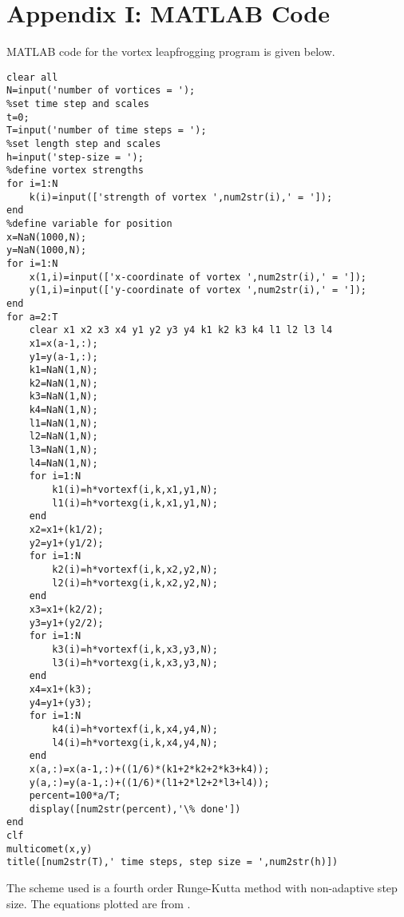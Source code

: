 \documentclass[10pt, a4paper]{article}
\numberwithin{equation}{section}
\begin{document}
\section*{Appendix I: MATLAB Code}\label{sec:ap1}
MATLAB code for the vortex leapfrogging program is given below.
\begin{verbatim}
clear all
N=input('number of vortices = ');
%set time step and scales
t=0;
T=input('number of time steps = ');
%set length step and scales
h=input('step-size = ');
%define vortex strengths
for i=1:N
    k(i)=input(['strength of vortex ',num2str(i),' = ']);
end
%define variable for position
x=NaN(1000,N);
y=NaN(1000,N);
for i=1:N
    x(1,i)=input(['x-coordinate of vortex ',num2str(i),' = ']);
    y(1,i)=input(['y-coordinate of vortex ',num2str(i),' = ']);
end
for a=2:T
    clear x1 x2 x3 x4 y1 y2 y3 y4 k1 k2 k3 k4 l1 l2 l3 l4
    x1=x(a-1,:);
    y1=y(a-1,:);
    k1=NaN(1,N);
    k2=NaN(1,N);
    k3=NaN(1,N);
    k4=NaN(1,N);
    l1=NaN(1,N);
    l2=NaN(1,N);
    l3=NaN(1,N);
    l4=NaN(1,N);
    for i=1:N
        k1(i)=h*vortexf(i,k,x1,y1,N);
        l1(i)=h*vortexg(i,k,x1,y1,N);
    end
    x2=x1+(k1/2);
    y2=y1+(y1/2);
    for i=1:N
        k2(i)=h*vortexf(i,k,x2,y2,N);
        l2(i)=h*vortexg(i,k,x2,y2,N);
    end
    x3=x1+(k2/2);
    y3=y1+(y2/2);
    for i=1:N
        k3(i)=h*vortexf(i,k,x3,y3,N);
        l3(i)=h*vortexg(i,k,x3,y3,N);
    end
    x4=x1+(k3);
    y4=y1+(y3);
    for i=1:N
        k4(i)=h*vortexf(i,k,x4,y4,N);
        l4(i)=h*vortexg(i,k,x4,y4,N);
    end
    x(a,:)=x(a-1,:)+((1/6)*(k1+2*k2+2*k3+k4));
    y(a,:)=y(a-1,:)+((1/6)*(l1+2*l2+2*l3+l4));
    percent=100*a/T;
    display([num2str(percent),'\% done'])
end
clf
multicomet(x,y)
title([num2str(T),' time steps, step size = ',num2str(h)])
\end{verbatim}
The scheme used is a fourth order Runge-Kutta method with non-adaptive step size. The equations plotted are from \citet{acheson00}.


\end{document}
